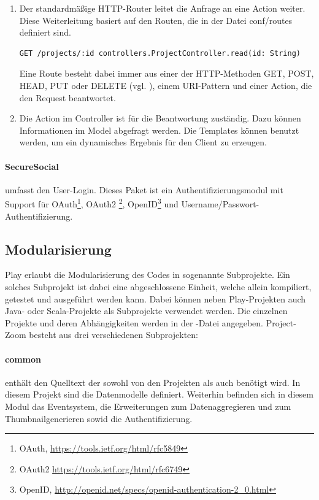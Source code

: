 \begin{enumerate}
  \item Der standardmäßige HTTP-Router leitet die Anfrage an eine Action weiter. Diese Weiterleitung basiert auf den Routen, die in der Datei conf/routes definiert sind.
\begin{lstlisting}
GET /projects/:id controllers.ProjectController.read(id: String)
\end{lstlisting}
Eine Route besteht dabei immer aus einer der HTTP-Methoden GET, POST, HEAD, PUT oder DELETE (vgl. \cite{play-scala-routing}), einem URI-Pattern und einer Action, die den Request beantwortet.
\item Die Action im Controller ist für die Beantwortung zuständig. Dazu können Informationen im Model abgefragt werden. Die Templates können benutzt werden, um ein dynamisches Ergebnis für den Client zu erzeugen.
\end{enumerate}

\paragraph{SecureSocial} umfasst den User-Login. Dieses Paket ist ein Authentifizierungsmodul mit Support für OAuth\footnote{OAuth, \url{https://tools.ietf.org/html/rfc5849}}, OAuth2 \footnote{OAuth2 \url{https://tools.ietf.org/html/rfc6749}}, OpenID\footnote{OpenID, \url{http://openid.net/specs/openid-authentication-2_0.html}} und Username/Passwort-Authentifizierung. 

\subsection{Modularisierung}
Play erlaubt die Modularisierung des Codes in sogenannte Subprojekte. Ein solches Subprojekt ist dabei eine abgeschlossene Einheit, welche allein kompiliert, getestet und ausgeführt werden kann. Dabei können neben Play-Projekten auch Java- oder Scala-Projekte als Subprojekte verwendet werden. Die einzelnen Projekte und deren Abhängigkeiten werden in der -Datei angegeben.
Project-Zoom besteht aus drei verschiedenen Subprojekten:

\paragraph{common} enthält den Quelltext der sowohl von den Projekten  als auch  benötigt wird. In diesem Projekt sind die Datenmodelle definiert. Weiterhin befinden sich in diesem Modul das Eventsystem, die Erweiterungen zum Datenaggregieren und zum Thumbnailgenerieren sowid die Authentifizierung.

